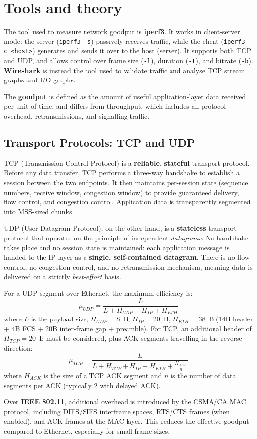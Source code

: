 \section{Tools and theory}

The tool used to measure network goodput is \textbf{iperf3}. It works in client-server mode: the server (\texttt{iperf3 -s}) passively receives traffic, while the client (\texttt{iperf3 -c <host>}) generates and sends it over to the host (server).
It supports both TCP and UDP, and allows control over frame size (\texttt{-l}), duration (\texttt{-t}), and bitrate (\texttt{-b}).
\textbf{Wireshark} is instead the tool used to validate traffic and analyse TCP stream graphs and I/O graphs.

The \textbf{goodput} is defined as the amount of useful application-layer data received per unit of time, and differs from throughput, which includes all protocol overhead, retransmissions, and signalling traffic.

\subsection{Transport Protocols: TCP and UDP}
TCP (Transmission Control Protocol) is a \textbf{reliable}, \textbf{stateful} transport protocol. Before any data transfer, TCP performs a three-way handshake to establish a session between the two endpoints. It then maintains per-session state (sequence numbers, receive window, congestion window) to provide guaranteed delivery, flow control, and congestion control. Application data is transparently segmented into MSS-sized chunks.

UDP (User Datagram Protocol), on the other hand, is a \textbf{stateless} transport protocol that operates on the principle of independent \textit{datagrams}. No handshake takes place and no session state is maintained: each application message is handed to the IP layer as a \textbf{single, self-contained datagram}. There is no flow control, no congestion control, and no retransmission mechanism, meaning data is delivered on a strictly \textit{best-effort} basis.

For a UDP segment over Ethernet, the maximum efficiency is:
\begin{equation}
\mu_{UDP} = \frac{L}{L + H_{UDP} + H_{IP} + H_{ETH}}
\end{equation}
where $L$ is the payload size, $H_{UDP} = 8$~B, $H_{IP} = 20$~B, $H_{ETH} = 38$~B (14B header + 4B FCS + 20B inter-frame gap + preamble). For TCP, an additional header of $H_{TCP} = 20$~B must be considered, plus ACK segments travelling in the reverse direction:
\begin{equation}
\mu_{TCP} = \frac{L}{L + H_{TCP} + H_{IP} + H_{ETH} + \frac{H_{ACK}}{n}}
\end{equation}
where $H_{ACK}$ is the size of a TCP ACK segment and $n$ is the number of data segments per ACK (typically 2 with delayed ACK).

Over \textbf{IEEE 802.11}, additional overhead is introduced by the CSMA/CA MAC protocol, including DIFS/SIFS interframe spaces, RTS/CTS frames (when enabled), and ACK frames at the MAC layer. This reduces the effective goodput compared to Ethernet, especially for small frame sizes.